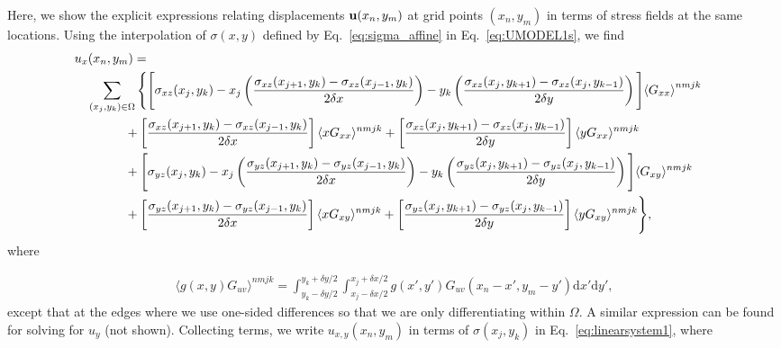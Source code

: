 \documentclass[aps,prl,reprint,twocolumn,groupedaddress,showpacs]{revtex4-1}
\def\dd{\mbox{d}}
\def\u{{\bf u}}
\begin{document}
\begin{widetext}
Here, we show the explicit expressions relating displacements $\u(x_{n}, y_{m})$ at 
grid points $(x_{n},y_{m})$ in terms of stress fields at the same locations. Using 
the interpolation of $\sigma(x,y)$ defined by Eq.~\ref{eq:sigma_affine} in 
Eq.~\ref{eq:UMODEL1s}, we find
%
\begin{align}
\lefteqn{u_x(x_n,y_m) =}  \nonumber\\
 & \quad \sum_{(x_j,y_k)\in\Omega} \Bigg\{ \Bigg[\sigma_{xz}(x_j,y_k)
- x_j\left(\frac{\sigma_{xz}(x_{j+1},y_k) - \sigma_{xz}(x_{j-1},y_k)}{2\delta x}\right)
 -y_k\left( \frac{\sigma_{xz}(x_j,y_{k+1}) -
\sigma_{xz}(x_j,y_{k-1})}{2\delta y}\right) \Bigg]{\langle G_{xx} \rangle}^{nmjk} \nonumber \\
& \qquad\qquad +\left[ \frac{\sigma_{xz}(x_{j+1},y_k) -
\sigma_{xz}(x_{j-1},y_k)}{2\delta x}\right]\langle xG_{xx} \rangle^{nmjk} + \left[  \frac{\sigma_{xz}(x_j,y_{k+1}) - \sigma_{xz}(x_j,y_{k-1}) }{2\delta y} \right]
\langle yG_{xx} \rangle^{nmjk}\nonumber\\
&\qquad\qquad + \Bigg[\sigma_{yz}(x_j,y_k)-x_j\left(\frac{\sigma_{yz}(x_{j+1},y_k)-
\sigma_{yz}(x_{j-1},y_k) }{2\delta x}\right)-y_k\left( \frac{\sigma_{yz}(x_j,y_{k+1}) 
-\sigma_{yz}(x_j,y_{k-1}) }{2\delta y}\right) \Bigg] \langle G_{xy} \rangle^{nmjk}\nonumber \\
&\qquad\qquad +\left[ \frac{\sigma_{yz}(x_{j+1},y_k) - 
\sigma_{yz}(x_{j-1},y_k) }{2\delta x}\right]  
\langle xG_{xy} \rangle^{nmjk} + 
\left[\frac{\sigma_{yz}(x_j,y_{k+1}) - 
\sigma_{yz}(x_j,y_{k-1}) }{2\delta y}\right]\langle yG_{xy} \rangle^{nmjk} \Bigg\},
\label{eq:ux_decomposed}
\end{align}
%
where

\begin{align}
\langle g(x,y)G_{uv} \rangle^{nmjk} = \int_{y_k-\delta y/2}^{y_k+\delta y/2} 
\int_{x_j-\delta x/2}^{x_j+\delta x/2} g(x',y')
G_{uv}(x_n-x',y_m-y')\dd x'\dd y', \label{eq:G_ave} 
\end{align}
%
except that at the edges where we use one-sided differences so that we
are only differentiating within $\Omega$. A similar expression can be
found for solving for $u_y$ (not shown). Collecting terms, we 
write $u_{x,y}(x_{n},y_{m})$ in terms of $\sigma(x_{j}, y_{k})$ 
in Eq.~\ref{eq:linearsystem1}, where 


\end{widetext}
\end{document}

